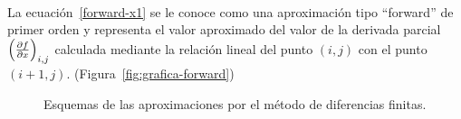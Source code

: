 \documentclass[letterpaper, openright, 12pt]{book}
\begin{document}
    \paragraph*{}
    La ecuación~\ref{forward-x1} se le conoce como una aproximación tipo
    ``forward'' de primer orden y representa el valor aproximado del valor de la
    derivada parcial $\left( \pdv{f}{x}\right)_{i,j}$ calculada mediante la
    relación lineal del punto $(i,j)$ con el punto $(i+1,j)$.
    (Figura~\ref{fig:grafica-forward})

    \begin{figure}[htbp!]
        \centering
        \caption[Aproximaciones por Diferencias Finitas]{Esquemas de las aproximaciones por el método de diferencias finitas.\cite{chapra}}
    \end{figure}
\end{document}
